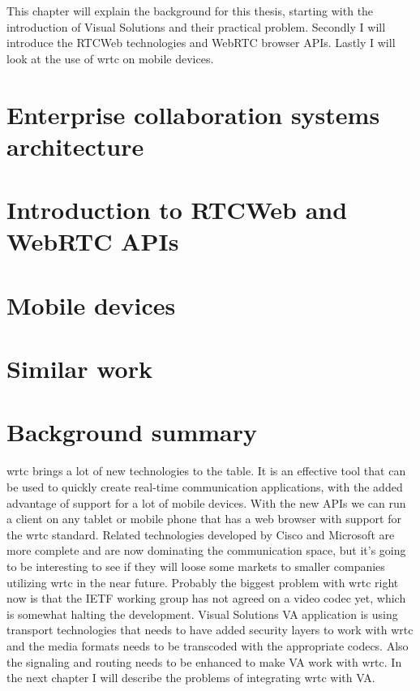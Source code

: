 
This chapter will explain the background for this thesis, starting with the introduction of Visual Solutions and their practical problem. Secondly I will introduce the RTCWeb technologies and WebRTC browser APIs. Lastly I will look at the use of \gls{wrtc} on mobile devices.%

\section{Enterprise collaboration systems architecture}


\newpage
\section{Introduction to RTCWeb and WebRTC APIs}


\newpage
\section{Mobile devices}


\newpage
\section{Similar work}


% 

\newpage
\section{Background summary}
\gls{wrtc} brings a lot of new technologies to the table. It is an effective tool that can be used to quickly create real-time communication applications, with the added advantage of support for a lot of mobile devices. With the new APIs we can run a client on any tablet or mobile phone that has a web browser with support for the \gls{wrtc} standard. Related technologies developed by Cisco and Microsoft are more complete and are now dominating the communication space, but it's going to be interesting to see if they will loose some markets to smaller companies utilizing \gls{wrtc} in the near future. Probably the biggest problem with \gls{wrtc} right now is that the IETF working group has not agreed on a video codec yet, which is somewhat halting the development. Visual Solutions VA application is using transport technologies that needs to have added security layers to work with \gls{wrtc} and the media formats needs to be transcoded with the appropriate codecs. Also the signaling and routing needs to be enhanced to make VA work with \gls{wrtc}. In the next chapter I will describe the problems of integrating \gls{wrtc} with VA.

